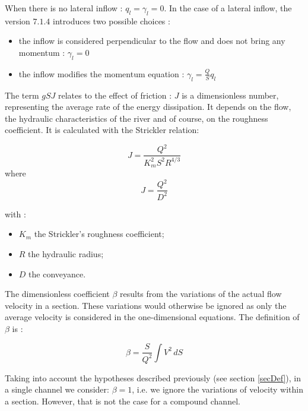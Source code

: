 \vspace{0.5cm}

When there is no lateral inflow : $q_l = \gamma_l = 0$. In the case of a lateral inflow, the version $7.1.4$ introduces two possible choices :

\begin{itemize}
 \item the inflow is considered perpendicular to the flow and does not bring any momentum : $\gamma_l = 0$
 \item the inflow modifies the momentum equation : $\gamma_l = \frac{Q}{S}q_l$
\end{itemize}

\vspace{0.5cm}

The term $gSJ$ relates to the effect of friction : $J$ is a dimensionless number, representing the average rate of the energy dissipation. It depends on the flow, the hydraulic characteristics of the river and of course, on the roughness coefficient. It is calculated with the Strickler relation:

   \begin{equation}
     J = \frac{Q^2}{K_{m}^{2}S^{2}R^{4/3}}
   \end{equation}
where
   \begin{equation}
     J = \frac{Q^2}{D^2}
   \end{equation}

with :
\begin{itemize}
 \item $K_m$ the Strickler's roughness coefficient;
 \item $R$ the hydraulic radius;
 \item $D$ the conveyance.
\end{itemize}

\vspace{0.5cm}

The dimensionless coefficient $\beta$ results from the variations of the actual flow velocity in a section. These variations would otherwise be ignored as only the average velocity is considered in the one-dimensional equations. The definition of $\beta$ is :

   \begin{equation}
     \beta = \frac{S}{Q^2} \int V^2 \,dS
   \end{equation}

\vspace{0.5cm}

Taking into account the hypotheses described previously (see section \ref{secDef}), in a single channel we consider: $\beta = 1$, i.e. we ignore the variations of velocity within a section. However, that is not the case for a compound channel. 

